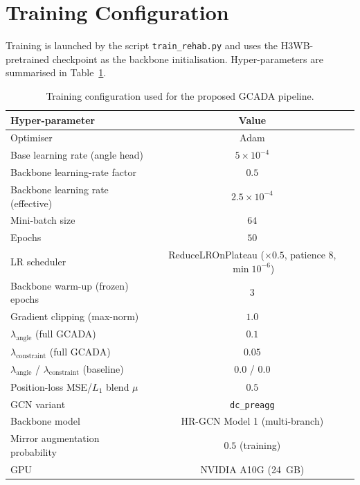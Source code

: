 \section{Training Configuration}
\label{sec:training}

Training is launched by the script \texttt{train\_rehab.py} and uses
the H3WB-pretrained checkpoint as the backbone initialisation.
Hyper-parameters are summarised in Table~\ref{tab:training-hp}.

\begin{table}[h]
\centering
\caption{Training configuration used for the proposed GCADA pipeline.}
\label{tab:training-hp}
\begin{tabular}{lc}
\hline
Hyper-parameter & Value \\
\hline
Optimiser                            & Adam \\
Base learning rate (angle head)      & $5\!\times\!10^{-4}$ \\
Backbone learning-rate factor        & $0.5$ \\
Backbone learning rate (effective)   & $2.5\!\times\!10^{-4}$ \\
Mini-batch size                      & $64$ \\
Epochs                               & $50$ \\
LR scheduler                         & ReduceLROnPlateau ($\times 0.5$, patience $8$, $\min 10^{-6}$) \\
Backbone warm-up (frozen) epochs     & $3$ \\
Gradient clipping (max-norm)         & $1.0$ \\
$\lambda_{\mathrm{angle}}$ (full GCADA)     & $0.1$ \\
$\lambda_{\mathrm{constraint}}$ (full GCADA)& $0.05$ \\
$\lambda_{\mathrm{angle}}$ / $\lambda_{\mathrm{constraint}}$ (baseline) & $0.0$ / $0.0$ \\
Position-loss MSE/$L_{1}$ blend $\mu$       & $0.5$ \\
GCN variant                          & \texttt{dc\_preagg} \\
Backbone model                       & HR-GCN Model 1 (multi-branch) \\
Mirror augmentation probability      & $0.5$ (training) \\
GPU                                  & NVIDIA A10G (24~GB) \\
\hline
\end{tabular}
\end{table}

